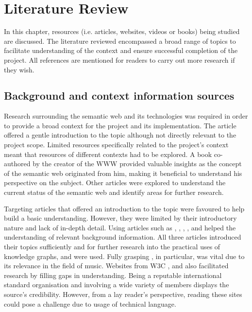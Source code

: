 \chapter{Literature Review}
In this chapter, resources (i.e. articles, websites, videos or books) being studied are discussed. The literature reviewed encompassed a broad range of topics to facilitate understanding of the context and ensure successful completion of the project. All references are mentioned for readers to carry out more research if they wish. 

\section{Background and context information sources}
\hspace{0.5cm} Research surrounding the semantic web and its technologies was required in order to provide a broad context for the project and its implementation. The article \cite{semanticweb} offered a gentle introduction to the topic although not directly relevant to the project scope. Limited resources specifically related to the project's context meant that resources of different contexts had to be explored. A book \cite{berners-TBLBook} co-authored by the creator of the WWW provided valuable insights as the concept of the semantic web originated from him, making it beneficial to understand his perspective on the subject. Other articles \cite{bizer2011linked} were explored to understand the current status of the semantic web and identify areas for further research. 

Targeting articles that offered an introduction to the topic were favoured to help build a basic understanding. However, they were limited by their introductory nature and lack of in-depth detail. Using articles such as \cite{ontology}, \cite{knowledgegraph}, \cite{sikos_2015}, \cite{gottschalk2021creation}, \cite{studer_benjamins_fensel_1998} and \cite{rdf} helped the understanding of relevant background information. All three articles introduced their topics sufficiently and for further research into the practical uses of knowledge graphs, \cite{searchengine} and \cite{oramas2016sound} were used. Fully grasping \cite{oramas2016sound}, in particular, was vital due to its relevance in the field of music. Websites from W3C \cite{TTL}, \cite{w3crdf} and \cite{w3cvocabularies} also facilitated research by filling gaps in understanding. Being a reputable international standard organisation and involving a wide variety of members displays the source's credibility. However, from a lay reader's perspective, reading these sites could pose a challenge due to usage of technical language. 

